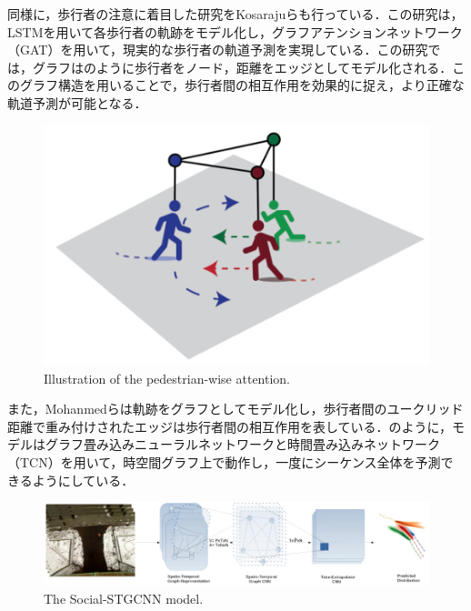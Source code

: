 \protect{}

同様に，歩行者の注意に着目した研究をKosarajuら\cite{s-bigat}も行っている．この研究は，LSTMを用いて各歩行者の軌跡をモデル化し，グラフアテンションネットワーク（GAT）を用いて，現実的な歩行者の軌道予測を実現している．この研究では，グラフはのように歩行者をノード，距離をエッジとしてモデル化される．このグラフ構造を用いることで，歩行者間の相互作用を効果的に捉え，より正確な軌道予測が可能となる．
\vspace{20pt}
\begin{figure}[hbtp]
     \centering
    \includegraphics[keepaspectratio, scale=0.4]
         {images/s-bigat.png}
    \caption{Illustration of the pedestrian-wise attention.\protect\footnotemark[3]}
    \label{Fig:s-bigat}
\end{figure}

\protect{}

また，Mohanmedら\cite{s-stgcnn}は軌跡をグラフとしてモデル化し，歩行者間のユークリッド距離で重み付けされたエッジは歩行者間の相互作用を表している．のように，モデルはグラフ畳み込みニューラルネットワークと時間畳み込みネットワーク（TCN）を用いて，時空間グラフ上で動作し，一度にシーケンス全体を予測できるようにしている．

\vspace{20pt}

\begin{figure}[hbtp]
     \centering
    \includegraphics[keepaspectratio, scale=0.39]
         {images/s-stgcnn.png}
    \caption{The Social-STGCNN model.\protect\footnotemark[4]}
    \label{Fig:s-stgcnn}
\end{figure}

